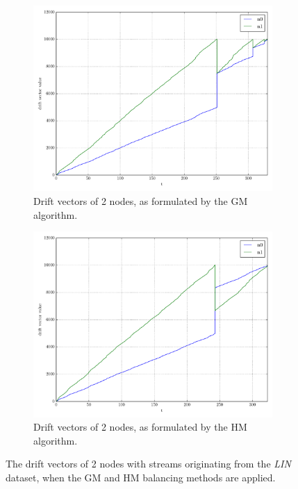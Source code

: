 \begin{figure}[!h]
\begin{subfigure}{0.49\textwidth}
  \includegraphics[width=\linewidth]{img/bal_classic_drifts_linear2N.pdf}
  \caption{Drift vectors of 2 nodes, as formulated by the GM algorithm.}
\end{subfigure}\hfill
\begin{subfigure}{0.49\textwidth}
  \includegraphics[width=\linewidth]{img/bal_heuristic_drifts_linear2N.pdf}
  \caption{Drift vectors of 2 nodes, as formulated by the HM algorithm.}
\end{subfigure}\hfill
\vspace{0.5cm}
\caption{The drift vectors of 2 nodes with streams originating from the \emph{LIN} dataset, when the GM and HM balancing methods are applied.} \label{fig:balComp-drifts}
\end{figure}

